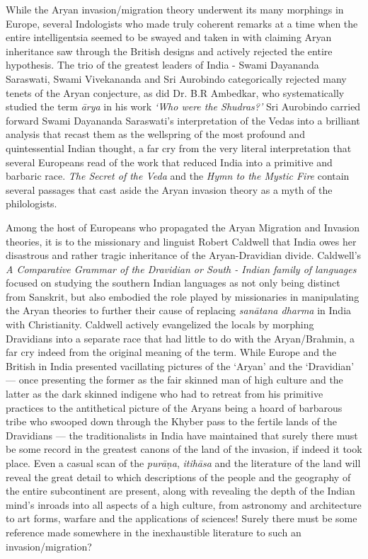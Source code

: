 While the Aryan invasion/migration theory underwent its many morphings in Europe, several Indologists who made truly coherent remarks at a time when the entire intelligentsia seemed to be swayed and taken in with claiming Aryan inheritance saw through the British designs and actively rejected the entire hypothesis. The trio of the greatest leaders of India - Swami Dayananda Saraswati, Swami Vivekananda and Sri Aurobindo categorically rejected many tenets of the Aryan conjecture, as did Dr. B.R Ambedkar, who systematically studied the term \textit{ārya} in his work \textit{‘Who were the Shudras?’} Sri Aurobindo carried forward Swami Dayananda Saraswati’s interpretation of the Vedas into a brilliant analysis that recast them as the wellspring of the most profound and quintessential Indian thought, a far cry from the very literal interpretation that several Europeans read of the work that reduced India into a primitive and barbaric race. \textit{The Secret of the Veda} and the \textit{Hymn to the Mystic Fire} contain several passages that cast aside the Aryan invasion theory as a myth of the philologists.

Among the host of Europeans who propagated the Aryan Migration and Invasion theories, it is to the missionary and linguist Robert Caldwell that India owes her disastrous and rather tragic inheritance of the Aryan-Dravidian divide. Caldwell’s \textit{A Comparative Grammar of the Dravidian or South - Indian family of languages} focused on studying the southern Indian languages as not only being distinct from Sanskrit, but also embodied the role played by missionaries in manipulating the Aryan theories to further their cause of replacing \textit{sanātana dharma} in India with Christianity. Caldwell actively evangelized the locals by morphing Dravidians into a separate race that had little to do with the Aryan/Brahmin, a far cry indeed from the original meaning of the term. While Europe and the British in India presented vacillating pictures of the ‘Aryan’ and the ‘Dravidian’ — once presenting the former as the fair skinned man of high culture and the latter as the dark skinned indigene who had to retreat from his primitive practices to the antithetical picture of the Aryans being a hoard of barbarous tribe who swooped down through the Khyber pass to the fertile lands of the Dravidians — the traditionalists in India have maintained that surely there must be some record in the greatest canons of the land of the invasion, if indeed it took place. Even a casual scan of the \textit{purāṇa}, \textit{itihāsa} and the literature of the land will reveal the great detail to which descriptions of the people and the geography of the entire subcontinent are present, along with revealing the depth of the Indian mind’s inroads into all aspects of a high culture, from astronomy and architecture to art forms, warfare and the applications of sciences! Surely there must be some reference made somewhere in the inexhaustible literature to such an invasion/migration?

